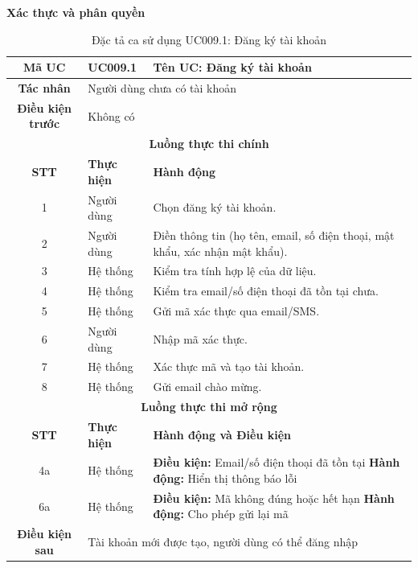 \textbf{Xác thực và phân quyền}
\begin{table}[H]
    \centering
    \label{tab:uc009-1}
    \begin{tabularx}{\textwidth}{|c|p{3.5cm}|X|}
        \hline
        \rowcolor{headergreen} 
        \textbf{Mã UC} & \textbf{UC009.1} & \textbf{Tên UC: Đăng ký tài khoản} \\ \hline
        \textbf{Tác nhân} & \multicolumn{2}{l|}{Người dùng chưa có tài khoản} \\ \hline
        \textbf{Điều kiện trước} & \multicolumn{2}{X|}{Không có} \\ \hline
        
        \multicolumn{3}{|c|}{\cellcolor{headerorange}\textbf{Luồng thực thi chính}} \\ \hline
        \rowcolor{graybg} \textbf{STT} & \textbf{Thực hiện} & \textbf{Hành động} \\ \hline
        1 & Người dùng & Chọn đăng ký tài khoản. \\ \hline
        2 & Người dùng & Điền thông tin (họ tên, email, số điện thoại, mật khẩu, xác nhận mật khẩu). \\ \hline
        3 & Hệ thống & Kiểm tra tính hợp lệ của dữ liệu. \\ \hline
        4 & Hệ thống & Kiểm tra email/số điện thoại đã tồn tại chưa. \\ \hline
        5 & Hệ thống & Gửi mã xác thực qua email/SMS. \\ \hline
        6 & Người dùng & Nhập mã xác thực. \\ \hline
        7 & Hệ thống & Xác thực mã và tạo tài khoản. \\ \hline
        8 & Hệ thống & Gửi email chào mừng. \\ \hline
        
        \multicolumn{3}{|c|}{\cellcolor{headerorange}\textbf{Luồng thực thi mở rộng}} \\ \hline
        \rowcolor{graybg} \textbf{STT} & \textbf{Thực hiện} & \textbf{Hành động và Điều kiện} \\ \hline
        4a & Hệ thống & \textbf{Điều kiện:} Email/số điện thoại đã tồn tại \newline \textbf{Hành động:} Hiển thị thông báo lỗi \\ \hline
        6a & Hệ thống & \textbf{Điều kiện:} Mã không đúng hoặc hết hạn \newline \textbf{Hành động:} Cho phép gửi lại mã \\ \hline
        
        \textbf{Điều kiện sau} & \multicolumn{2}{X|}{Tài khoản mới được tạo, người dùng có thể đăng nhập} \\ \hline
    \end{tabularx}
    \caption{Đặc tả ca sử dụng UC009.1: Đăng ký tài khoản}
\end{table}

